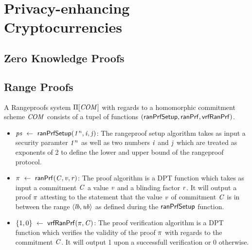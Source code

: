 \section{Privacy-enhancing Cryptocurrencies} \label{sec:pre:privacy}

\subsection{Zero Knowledge Proofs} \label{sec:pre:privacy:zeroknowlegde}

\subsection{Range Proofs} \label{sec:pre:rangeproof}

\begin{definition}\label{def:pre:rangeproof}
    A Rangeproofs system $\Pi[\mathit{COM}]$ with regards to a homomorphic commitment scheme $\mathit{COM}$ consists of a tupel of functions $(\mathsf{ranPrfSetup}, \mathsf{ranPrf}, \mathsf{vrfRanPrf})$.
    \begin{itemize}
        \item $\mathit{ps} ~\leftarrow~ \mathsf{ranPrfSetup}(\mathit{1^n},\mathit{i},\mathit{j})$: The rangeproof setup algorithm takes as input a security paramter $\mathit{1^n}$ as well as two numbers
        $\mathit{i}$ and $\mathit{j}$ which are treated as exponents of 2 to define the lower and upper bound of the rangeproof protocol.
        \item $\pi ~\leftarrow~ \mathsf{ranPrf}(\mathit{C},\mathit{v},\mathit{r})$: The proof algorithm is a DPT function which takes as input a commitment $\mathit{C}$ a value $\mathit{v}$ and
        a blinding factor $\mathit{r}$. It will output a proof $\pi$ attesting to the statement that the value $\mathit{v}$ of commitment $\mathit{C}$ is in between the range $\langle \mathit{lb}, \mathit{ub} \rangle$ as
        defined during the $\mathsf{ranPrfSetup}$ function.
        \item $\{1,0\} ~\leftarrow~ \mathsf{vrfRanPrf}(\pi,\mathit{C})$: The proof verification algorithm is a DPT function which verifies the validity of the proof $\pi$ with regards to the commitment
        $\mathit{C}$. It will output 1 upon a successfull verification or 0 otherwise.
    \end{itemize}
\end{definition}

